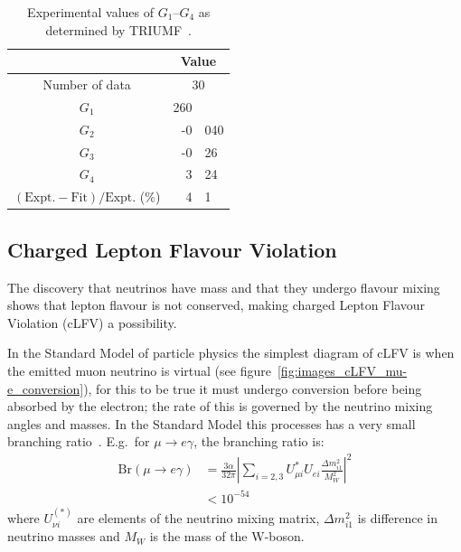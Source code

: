 \begin{table}
  \begin{center}
  \begin{tabular}{c | r@{.}l }
                                                              & \multicolumn{2}{c}{Value} \\
    \hline
    Number of data                                            & \multicolumn{2}{c}{30}                 \\
    \hline
    \( G_1 \)                                                 &             260 &                       \\
    \( G_2 \)                                                 &              -0 & 040                   \\
    \( G_3 \)                                                 &              -0 & 26                    \\
    \( G_4 \)                                                 &               3 & 24                    \\
    \hline
    \( (\textrm{Expt.} - \textrm{Fit})/\textrm{Expt.} \) (\%) &               4 & 1                     \\
  \end{tabular}
  \end{center}
  \caption{Experimental values of \( G_1 \)--\( G_4 \) as determined by TRIUMF~\cite{suzuki_mu_capture_rates}.}
  \label{tab:g1_to_g4}
\end{table}


\subsection{Charged Lepton Flavour Violation} %
\label{sec:charged_lepton_flavour_violation}
The discovery that neutrinos have mass and that they undergo flavour mixing shows that lepton flavour is not conserved, making charged Lepton Flavour Violation (cLFV) a possibility. 

In the Standard Model of particle physics the simplest diagram of cLFV is when the emitted muon neutrino is virtual (see figure~\ref{fig:images_cLFV_mu-e_conversion}), for this to be true it must undergo conversion before being absorbed by the electron; the rate of this is governed by the neutrino mixing angles and masses. In the Standard Model this processes has a very small branching ratio~\cite{effective_lagrangian_for_clfv}. E.g.\ for \( \mu\rightarrow e\gamma \), the branching ratio is: 
\begin{align}
  \text{Br}(\mu\rightarrow e\gamma) 
    &= \frac{3\alpha}{32\pi}
      \left|\sum\limits_{i=2,3} U^*_{\mu i} U_{ei}
            \frac{\Delta m^2_{i1}}{M^2_W}
     \right|^2 \\
    &< 10^{-54} \label{equ:clfv_branching_ratio}
\end{align}
where \( U_{\nu i}^{(*)} \) are elements of the neutrino mixing matrix, \(\Delta m^2_{i1}\) is difference in neutrino masses and \(M_{W}\) is the mass of the W-boson.


